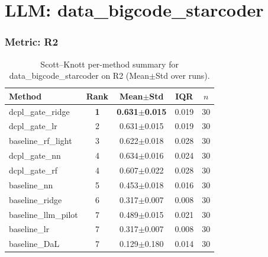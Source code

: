 \section*{LLM: data\_bigcode\_starcoder}

\subsubsection*{Metric: R2}
\begin{table}[H]
\centering
\scriptsize
\setlength{\tabcolsep}{4pt}
\renewcommand{\arraystretch}{1.1}
\caption{Scott--Knott per-method summary for data\_bigcode\_starcoder on R2 (Mean$\pm$Std over runs).}
\label{tab:sk_data_bigcode_starcoder_R2}
\begin{tabular}{l|c|c|c|c}
\hline
\textbf{Method} & \textbf{Rank} & \textbf{Mean$\pm$Std} & \textbf{IQR} & \textbf{$n$} \\
\hline
\rowcolor{red!15} dcpl\_gate\_ridge & \textbf{1} & \textbf{0.631$\pm$0.015} & 0.019 & 30 \\
dcpl\_gate\_lr & 2 & 0.631$\pm$0.015 & 0.019 & 30 \\
baseline\_rf\_light & 3 & 0.622$\pm$0.018 & 0.028 & 30 \\
dcpl\_gate\_nn & 4 & 0.634$\pm$0.016 & 0.024 & 30 \\
dcpl\_gate\_rf & 4 & 0.607$\pm$0.022 & 0.028 & 30 \\
baseline\_nn & 5 & 0.453$\pm$0.018 & 0.016 & 30 \\
baseline\_ridge & 6 & 0.317$\pm$0.007 & 0.008 & 30 \\
baseline\_llm\_pilot & 7 & 0.489$\pm$0.015 & 0.021 & 30 \\
baseline\_lr & 7 & 0.317$\pm$0.007 & 0.008 & 30 \\
baseline\_DaL & 7 & 0.129$\pm$0.180 & 0.014 & 30 \\
\hline
\end{tabular}
\end{table}

